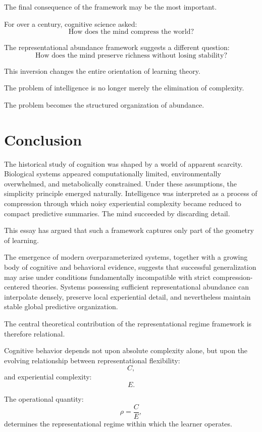 \documentclass[12pt,a4paper]{article}
\begin{document}
The final consequence of the framework may be the most important.

For over a century, cognitive science asked:
\[
\text{How does the mind compress the world?}
\]

The representational abundance framework suggests a different question:
\[
\text{How does the mind preserve richness without losing stability?}
\]

This inversion changes the entire orientation of learning theory.

The problem of intelligence is no longer merely the elimination of complexity.

The problem becomes the structured organization of abundance.

\section{Conclusion}

The historical study of cognition was shaped by a world of apparent scarcity. Biological systems appeared computationally limited, environmentally overwhelmed, and metabolically constrained. Under these assumptions, the simplicity principle emerged naturally. Intelligence was interpreted as a process of compression through which noisy experiential complexity became reduced to compact predictive summaries. The mind succeeded by discarding detail.

This essay has argued that such a framework captures only part of the geometry of learning.

The emergence of modern overparameterized systems, together with a growing body of cognitive and behavioral evidence, suggests that successful generalization may arise under conditions fundamentally incompatible with strict compression-centered theories. Systems possessing sufficient representational abundance can interpolate densely, preserve local experiential detail, and nevertheless maintain stable global predictive organization.

The central theoretical contribution of the representational regime framework is therefore relational.

Cognitive behavior depends not upon absolute complexity alone, but upon the evolving relationship between representational flexibility:
\[
C,
\]
and experiential complexity:
\[
E.
\]

The operational quantity:
\[
\rho
=
\frac{C}{E},
\]
determines the representational regime within which the learner operates.
\end{document}
